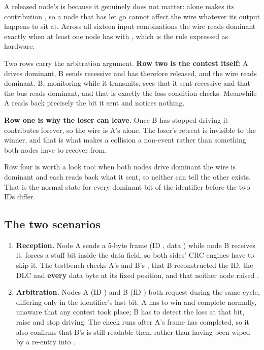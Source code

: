 A released node's  is \code{-} because it genuinely does not matter: 
alone makes its contribution , so a node that has let go cannot affect the wire whatever its
output happens to sit at. Across all sixteen input combinations the wire reads dominant exactly when
at least one node has  with , which is the rule expressed as
hardware.

Two rows carry the arbitration argument. \textbf{Row two is the contest itself:} A drives dominant, B
sends recessive and has therefore released, and the wire reads dominant. B, monitoring while it
transmits, sees that it sent recessive and that the bus reads dominant, and that is exactly the loss
condition  checks. Meanwhile A reads back precisely the bit it sent and notices
nothing.

\textbf{Row one is why the loser can leave.} Once B has stopped driving it contributes 
forever, so the wire is A's alone. The loser's retreat is invisible to the winner, and that is what
makes a collision a non-event rather than something both nodes have to recover from.

Row four is worth a look too: when both nodes drive dominant the wire is dominant and each reads back
what it sent, so neither can tell the other exists. That is the normal state for every dominant bit of
the identifier before the two IDs differ.

\subsection*{The two scenarios}
\begin{enumerate}
  \item \textbf{Reception.} Node A sends a 5-byte frame (ID , data
    ) while node B receives it.  forces a stuff bit inside the data
    field, so both sides' CRC engines have to skip it. The testbench checks A's  and
    B's , that B reconstructed the ID, the DLC and \textbf{every} data byte at its
    fixed position, and that neither node raised .
  \item \textbf{Arbitration.} Nodes A (ID ) and B (ID ) both request during
    the same cycle, differing only in the identifier's last bit. A has to win and complete normally,
    unaware that any contest took place; B has to detect the loss at that bit, raise  and
    stop driving. The check runs after A's frame has completed, so it also confirms that B's
     is still readable then, rather than having been wiped by a re-entry into
    .
\end{enumerate}

